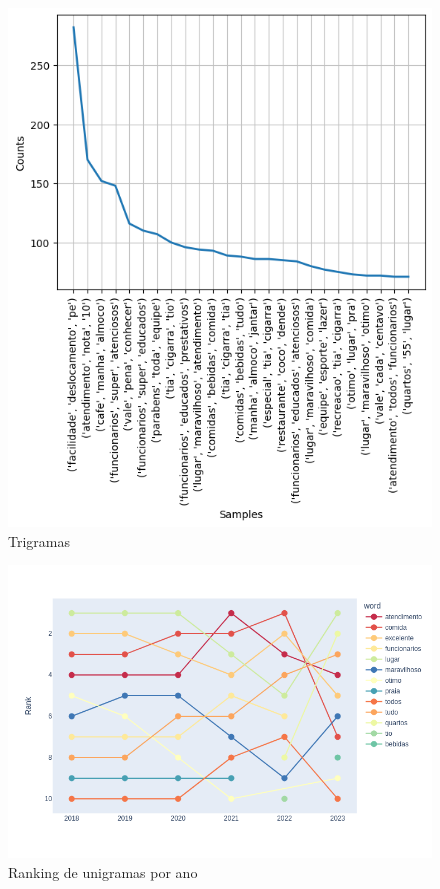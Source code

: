 \begin{figure}
	\centering
	\includegraphics[width=.8\textwidth]{figs/exploratoria/trigramas.png}
	\caption{Trigramas}
	\label{img:trigramas}
\end{figure}

\begin{figure}
	\centering
	\includegraphics[width=1\textwidth]{figs/exploratoria/ranking_unigramas_por_ano.png}
	\caption{Ranking de unigramas por ano}
	\label{img:rank_unigramas}
\end{figure}

